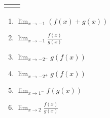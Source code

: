 \documentclass{article}
\newcommand{\fgraff}{
    \begin{minipage}[l][.30\textwidth]{3 in}{
    \begin{tikzpicture}
    \begin{axis}[
       	xmin=-3.25, xmax=3.25,
    	ymin=-2.25, ymax=2.25,
    	major tick length={0},
    	xtick={-3,-2,...,3}, ytick={-2,-1,...,2},
    	line width=1pt, title={\textbf{Graph of $f$}},
     	axis lines=center, height=2 in, width=3 in, grid=major,
     	restrict y to domain=-2.25:2.25
    	]
    	\addplot [mark=*, black, smooth, very thick] plot coordinates {(-3,2)(-2,1)};
    	\addplot [mark=*, black, smooth, very thick] plot coordinates {(-2,3)};
    	\addplot [mark=*, black, smooth, very thick] plot coordinates {(-2,0)(-1,1)};
    	\addplot [mark=*, black, smooth, very thick] plot coordinates {(-1,2)(1,2)};
    	\addplot [mark=*, black, smooth, very thick] plot coordinates {(2,-1)(3,-1)};
        \addplot [black, smooth, very thick, samples=100, domain=1:2] {(x-1)^2};
        \addplot [black, only marks, very thick, mark=*, mark options={scale=1, fill=white}]
        coordinates{(1,0) (2,1) (-1,2) (-2,1) (-2,0)};
        \addplot [black, only marks, very thick, mark=*] coordinates{(-2,2)};
    \end{axis}
    \end{tikzpicture}
    }
    \end{minipage}}
\newcommand{\ggraff}{
    \begin{minipage}[l][.30\textwidth]{3 in}{
    \begin{tikzpicture}
    \begin{axis}[
       	xmin=-3.25, xmax=3.25,
    	ymin=-2.25, ymax=2.25,
    	major tick length={0},
    	xtick={-3,-2,...,3}, ytick={-2,-1,...,2},
    	line width=1pt, title={\textbf{Graph of $g$}},
     	axis lines=center, height=2 in, width=3 in, grid=major,
     	restrict y to domain=-2.25:2.25
    	]
    	\addplot [mark=*, black, smooth, very thick] plot coordinates {(-3,-1)(-1,-1)};
    	\addplot [mark=*, black, smooth, very thick] plot coordinates {(1,-1)(3,1)};
    	\addplot [black, very thick, mark=*, mark options={scale=1, fill=white}] plot coordinates {(-1,-2)(1,-2)};
    \end{axis}
    \end{tikzpicture}
    }
    \end{minipage}}
\begin{document}
\begin{enumerate}
                        \begin{center}
                        \begin{tabular}{l r}
                        \fgraff & \ggraff
                        \end{tabular}
                        \end{center}
                        \begin{enumerate}
                        \item $ \lim_{x\rightarrow -1} (f(x)+g(x))$
                        \item $ \lim_{x\rightarrow -1} \frac{f(x)}{g(x)}$
                        \item $ \lim_{x \rightarrow -2^-} g(f(x))$
                        \item $ \lim_{x \rightarrow -2^+} g(f(x))$
                        \item $ \lim_{x\rightarrow 1^-} f(g(x))$
                        \item $ \lim_{x\rightarrow 2} \frac{f(x)}{g(x)}$
                        \end{enumerate}
                        
                        
    
    
                    \end{enumerate}
    
    
    
\end{document}
